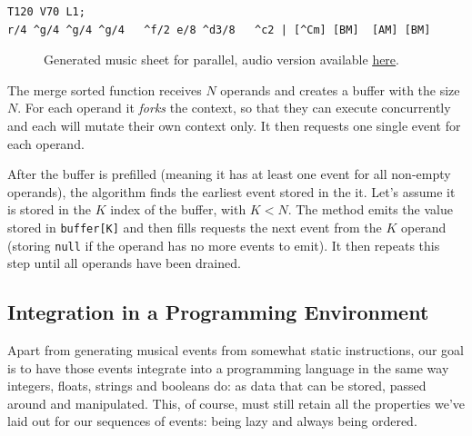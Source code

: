 \documentclass[a4paper,UKenglish,cleveref, autoref]{oasics-v2019}
\begin{document}
\begin{lstlisting}[caption={Snippet of the song \textit{Soft to Be Strong} by Marina},label=list:6,captionpos=t,abovecaptionskip=-\medskipamount]
T120 V70 L1;
r/4 ^g/4 ^g/4 ^g/4   ^f/2 e/8 ^d3/8   ^c2 | [^Cm] [BM]  [AM] [BM] 
\end{lstlisting}

\begin{figure}[ht]
  \centering
  {%
  \setlength{\fboxsep}{0pt}%
  \setlength{\fboxrule}{0pt}%
  }%
  \caption{Generated music sheet for parallel, audio version available \href{https://drive.google.com/open?id=1ENTm3hZonYHyQIOgRZ8TQ1Qz-AfRLt2I}{\underline{here}}.}
  \label{fig:parallel}
\end{figure}


The merge sorted function receives $N$ operands and creates a buffer with the size $N$. For each operand it \textit{forks} the context, so that they can execute concurrently and each will mutate their own context only. It then requests one single event for each operand.

After the buffer is prefilled (meaning it has at least one event for all non-empty operands), the algorithm finds the earliest event stored in the it. Let's assume it is stored in the $K$ index of the buffer, with $K < N$. The method emits the value stored in \texttt{buffer[K]} and then fills requests the next event from the $K$ operand (storing \texttt{null} if the operand has no more events to emit). It then repeats this step until all operands have been drained.

\subsection{Integration in a Programming Environment}
Apart from generating musical events from somewhat static instructions, our goal is to have those events integrate into a programming language in the same way integers, floats, strings and booleans do: as data that can be stored, passed around and manipulated. This, of course, must still retain all the properties we've laid out for our sequences of events: being lazy and always being ordered.
\end{document}
